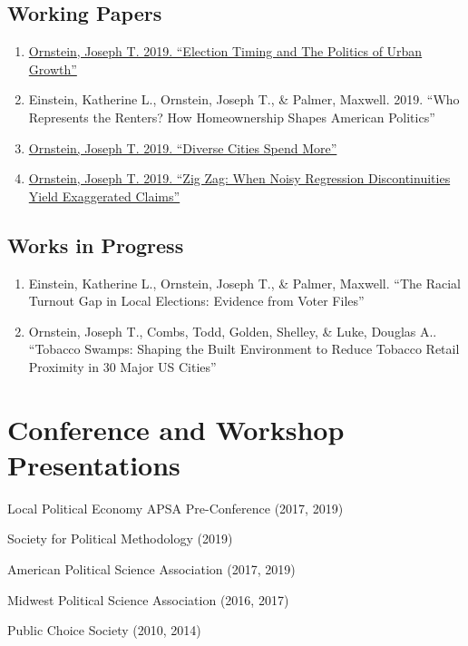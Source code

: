 \documentclass[letterpaper]{article}
\renewenvironment{itemize}{
  \begin{list}{}{
    \setlength{\leftmargin}{1.5em}
  }
}{
  \end{list}
}
\begin{document}
\subsection*{Working Papers}
\begin{enumerate}
	\item \href{https://joeornstein.github.io/ElectionTiming.html}{Ornstein, Joseph T. 2019. ``Election Timing and The Politics of Urban Growth''}
\item Einstein, Katherine L., Ornstein, Joseph T., \& Palmer, Maxwell. 2019. ``Who Represents the Renters? How Homeownership Shapes American Politics'' 
\item \href{https://joeornstein.github.io/papers/dcsm.pdf}{Ornstein, Joseph T. 2019. ``Diverse Cities Spend More''} %
\item \href{https://joeornstein.github.io/research/zig-zag}{Ornstein, Joseph T. 2019. ``Zig Zag: When Noisy Regression Discontinuities Yield Exaggerated Claims''} %
\end{enumerate}

\subsection*{Works in Progress}
\begin{enumerate}
	\item Einstein, Katherine L., Ornstein, Joseph T., \& Palmer, Maxwell.  ``The Racial Turnout Gap in Local Elections: Evidence from Voter Files''
	\item Ornstein, Joseph T., Combs, Todd, Golden, Shelley, \& Luke, Douglas A.. ``Tobacco Swamps: Shaping the Built Environment to Reduce Tobacco Retail Proximity in 30 Major US Cities''
\end{enumerate}

\hrulefill
\section*{Conference and Workshop Presentations}
\begin{itemize}
	\item Local Political Economy APSA Pre-Conference (2017, 2019)
\item Society for Political Methodology (2019)
\item American Political Science Association (2017, 2019)
\item Midwest Political Science Association (2016, 2017)
\item Public Choice Society (2010, 2014)
\end{itemize}
\end{document}
